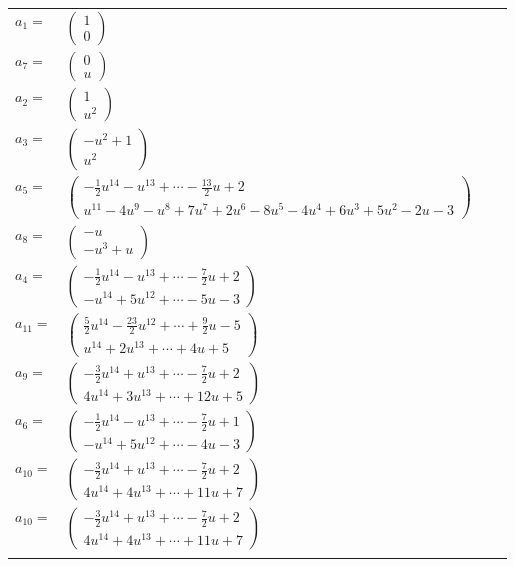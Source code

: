 \documentclass[1p]{elsarticle_modified}
\theoremstyle{definition}
\begin{document}
\begin{tabular}{m{7pt} m{180pt} m{7pt} m{180pt} }
\flushright $a_{1}=$&$\begin{pmatrix}1\\0\end{pmatrix}$ \\
\flushright $a_{7}=$&$\begin{pmatrix}0\\u\end{pmatrix}$ \\
\flushright $a_{2}=$&$\begin{pmatrix}1\\u^2\end{pmatrix}$ \\
\flushright $a_{3}=$&$\begin{pmatrix}- u^2+1\\u^2\end{pmatrix}$ \\
\flushright $a_{5}=$&$\begin{pmatrix}-\frac{1}{2} u^{14}- u^{13}+\cdots-\frac{13}{2} u+2\\u^{11}-4 u^9- u^8+7 u^7+2 u^6-8 u^5-4 u^4+6 u^3+5 u^2-2 u-3\end{pmatrix}$ \\
\flushright $a_{8}=$&$\begin{pmatrix}- u\\- u^3+u\end{pmatrix}$ \\
\flushright $a_{4}=$&$\begin{pmatrix}-\frac{1}{2} u^{14}- u^{13}+\cdots-\frac{7}{2} u+2\\- u^{14}+5 u^{12}+\cdots-5 u-3\end{pmatrix}$ \\
\flushright $a_{11}=$&$\begin{pmatrix}\frac{5}{2} u^{14}-\frac{23}{2} u^{12}+\cdots+\frac{9}{2} u-5\\u^{14}+2 u^{13}+\cdots+4 u+5\end{pmatrix}$ \\
\flushright $a_{9}=$&$\begin{pmatrix}-\frac{3}{2} u^{14}+u^{13}+\cdots-\frac{7}{2} u+2\\4 u^{14}+3 u^{13}+\cdots+12 u+5\end{pmatrix}$ \\
\flushright $a_{6}=$&$\begin{pmatrix}-\frac{1}{2} u^{14}- u^{13}+\cdots-\frac{7}{2} u+1\\- u^{14}+5 u^{12}+\cdots-4 u-3\end{pmatrix}$ \\
\flushright $a_{10}=$&$\begin{pmatrix}-\frac{3}{2} u^{14}+u^{13}+\cdots-\frac{7}{2} u+2\\4 u^{14}+4 u^{13}+\cdots+11 u+7\end{pmatrix}$\\ \flushright $a_{10}=$&$\begin{pmatrix}-\frac{3}{2} u^{14}+u^{13}+\cdots-\frac{7}{2} u+2\\4 u^{14}+4 u^{13}+\cdots+11 u+7\end{pmatrix}$\\&\end{tabular}
\end{document}
